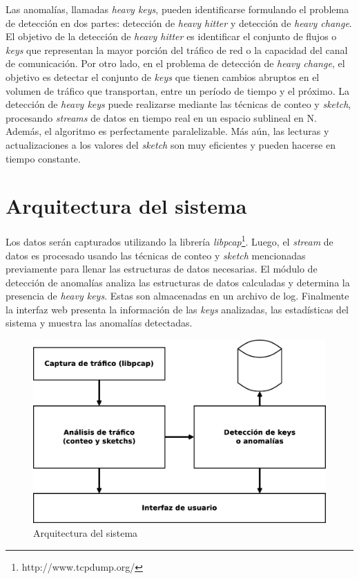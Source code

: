 \documentclass[a4paper,10pt, oneside]{article}
\begin{document}
Las anomalías, llamadas \textit{heavy keys}, pueden identificarse formulando el problema de detección en dos partes: detección de \textit{heavy hitter} y detección de \textit{heavy change}. El objetivo de la detección de \textit{heavy hitter} es identificar el conjunto de flujos o \textit{keys} que representan la mayor porción del tráfico de red o la capacidad del canal de comunicación\cite{estan2002new}. Por otro lado, en el problema de detección de \textit{heavy change}, el objetivo es detectar el conjunto de \textit{keys} que tienen cambios abruptos en el volumen de tráfico que transportan, entre un período de tiempo y el próximo\cite{krishnamurthy2003sketch}. La detección de \textit{heavy keys} puede realizarse mediante las técnicas de conteo y \textit{sketch}, procesando \textit{streams} de datos en tiempo real en un espacio sublineal en N. Además, el algoritmo es perfectamente paralelizable\cite{liberty2013simple}. Más aún, las lecturas y actualizaciones a los valores del \textit{sketch} son muy eficientes y pueden hacerse en tiempo constante\cite{goyal2010sketching}.

\section{Arquitectura del sistema}
Los datos serán capturados utilizando la librería \textit{libpcap}\footnote{http://www.tcpdump.org/}. Luego, el \textit{stream} de datos es procesado usando las técnicas de conteo y \textit{sketch} mencionadas previamente para llenar las estructuras de datos necesarias. El módulo de detección de anomalías analiza las estructuras de datos calculadas y determina la presencia de \textit{heavy keys}. Estas son almacenadas en un archivo de log. Finalmente la interfaz web presenta la información de las \textit{keys} analizadas, las estadísticas del sistema y muestra las anomalías detectadas.

\begin{figure}[htpb]
	\centering
	\includegraphics[scale=0.2]{graph/arquitectura}
	\caption{Arquitectura del sistema}
\end{figure}
\end{document}
